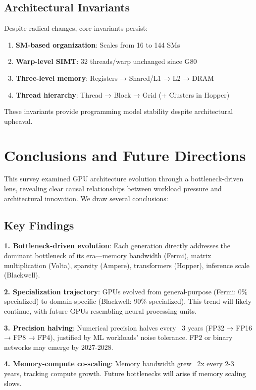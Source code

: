 \documentclass{article}
\begin{document}
\subsection{Architectural Invariants}

Despite radical changes, core invariants persist:
\begin{enumerate}
\item \textbf{SM-based organization}: Scales from 16 to 144 SMs
\item \textbf{Warp-level SIMT}: 32 threads/warp unchanged since G80
\item \textbf{Three-level memory}: Registers → Shared/L1 → L2 → DRAM
\item \textbf{Thread hierarchy}: Thread → Block → Grid (+ Clusters in Hopper)
\end{enumerate}

These invariants provide programming model stability despite architectural upheaval.

\section{Conclusions and Future Directions}

This survey examined GPU architecture evolution through a bottleneck-driven lens, revealing clear causal relationships between workload pressure and architectural innovation. We draw several conclusions:

\subsection{Key Findings}

\textbf{1. Bottleneck-driven evolution}: Each generation directly addresses the dominant bottleneck of its era—memory bandwidth (Fermi), matrix multiplication (Volta), sparsity (Ampere), transformers (Hopper), inference scale (Blackwell).

\textbf{2. Specialization trajectory}: GPUs evolved from general-purpose (Fermi: 0\% specialized) to domain-specific (Blackwell: 90\% specialized). This trend will likely continue, with future GPUs resembling neural processing units.

\textbf{3. Precision halving}: Numerical precision halves every ~3 years (FP32 → FP16 → FP8 → FP4), justified by ML workloads' noise tolerance. FP2 or binary networks may emerge by 2027-2028.

\textbf{4. Memory-compute co-scaling}: Memory bandwidth grew ~2x every 2-3 years, tracking compute growth. Future bottlenecks will arise if memory scaling slows.
\end{document}
